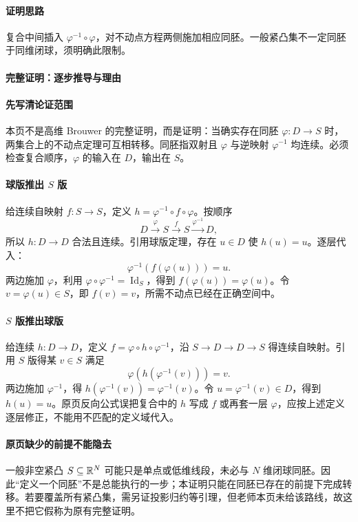 \paragraph{证明思路}复合中间插入 $\varphi^{-1}\circ\varphi$，对不动点方程两侧施加相应同胚。一般紧凸集不一定同胚于同维闭球，须明确此限制。
\paragraph{完整证明：逐步推导与理由}

\paragraph{先写清论证范围}
本页不是高维 Brouwer 的完整证明，而是证明：当确实存在同胚 $\varphi:D\to S$ 时，两集合上的不动点定理可互相转移。同胚指双射且 $\varphi$ 与逆映射 $\varphi^{-1}$ 均连续。必须检查复合顺序，$\varphi$ 的输入在 $D$，输出在 $S$。
\paragraph{球版推出 $S$ 版}
给连续自映射 $f:S\to S$，定义 $h=\varphi^{-1}\circ f\circ\varphi$。按顺序
\[D\xrightarrow{\varphi}S\xrightarrow{f}S\xrightarrow{\varphi^{-1}}D,\]
所以 $h:D\to D$ 合法且连续。引用球版定理，存在 $u\in D$ 使 $h(u)=u$。逐层代入：
\[\varphi^{-1}(f(\varphi(u)))=u.\]
两边施加 $\varphi$，利用 $\varphi\circ\varphi^{-1}=\operatorname{Id}_S$，得到 $f(\varphi(u))=\varphi(u)$。令 $v=\varphi(u)\in S$，即 $f(v)=v$，所需不动点已经在正确空间中。
\paragraph{$S$ 版推出球版}
给连续 $h:D\to D$，定义 $f=\varphi\circ h\circ\varphi^{-1}$，沿 $S\to D\to D\to S$ 得连续自映射。引用 $S$ 版得某 $v\in S$ 满足
\[\varphi(h(\varphi^{-1}(v)))=v.\]
两边施加 $\varphi^{-1}$，得 $h(\varphi^{-1}(v))=\varphi^{-1}(v)$。令 $u=\varphi^{-1}(v)\in D$，得到 $h(u)=u$。原页反向公式误把复合中的 $h$ 写成 $f$ 或再套一层 $\varphi$，应按上述定义逐层修正，不能用不匹配的定义域代入。
\paragraph{原页缺少的前提不能隐去}
一般非空紧凸 $S\subseteq\mathbb{R}^N$ 可能只是单点或低维线段，未必与 $N$ 维闭球同胚。因此“定义一个同胚”不是总能执行的一步；本证明只能在同胚已存在的前提下完成转移。若要覆盖所有紧凸集，需另证投影归约等引理，但老师本页未给该路线，故这里不把它假称为原有完整证明。

